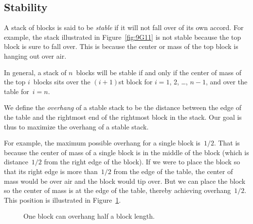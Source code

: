 \subsection{Stability}\label{sec:stability}

A stack of blocks is said to be \emph{stable} if it will not fall over
of its own accord.  For example, the stack illustrated in
Figure~\ref{fig:9G11} is not stable because the top block is sure to
fall over.  This is because the center or mass of the top block is
hanging out over air.

In general, a stack of $n$~blocks will be stable if and only if the
center of mass of the top $i$~blocks sits over the $(i + 1)$st block
for $i = 1$, 2, \dots, $n - 1$, and over the table for~$i = n$.

We define the \emph{overhang} of a stable stack to be the distance
between the edge of the table and the rightmost end of the rightmost
block in the stack.  Our goal is thus to maximize the overhang of a
stable stack.

For example, the maximum possible overhang for a single block
is~$1/2$.  That is because the center of mass of a single block is in
the middle of the block (which is distance~$1/2$ from the right edge
of the block).  If we were to place the block so that its right edge
is more than~$1/2$ from the edge of the table, the center of mass
would be over air and the block would tip over.  But we can place the
block so the center of mass is at the edge of the table, thereby
achieving overhang~$1/2$.  This position is illustrated in
Figure~\ref{fig:one-stable-block}.

\begin{figure}


\caption{One block can overhang half a block length.}

\label{fig:one-stable-block}

\end{figure}

\fi
